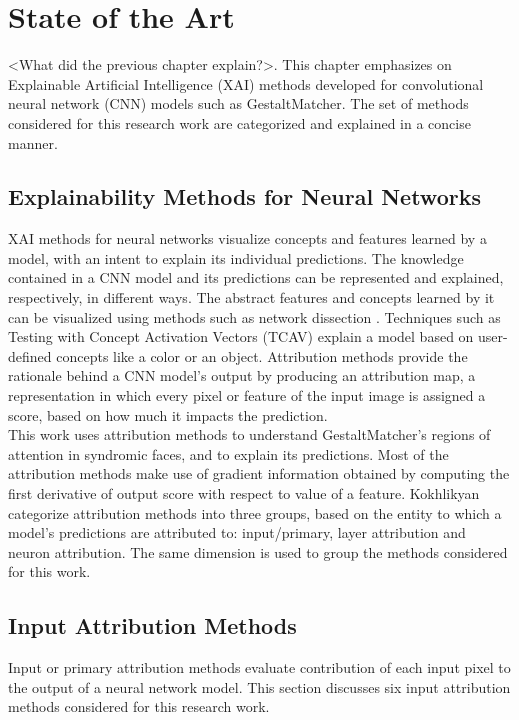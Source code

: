 \documentclass[../report.tex]{subfiles}
\begin{document}
    \chapter{State of the Art}
	<What did the previous chapter explain?>. This chapter emphasizes on Explainable Artificial Intelligence (XAI) methods developed for convolutional neural network (CNN) models such as GestaltMatcher. The set of methods considered for this research work are categorized and explained in a concise manner. 

    \section{Explainability Methods for Neural Networks}
    XAI methods for neural networks visualize concepts and features learned by a model, with an intent to explain its individual predictions. The knowledge contained in a CNN model and its predictions can be represented and explained, respectively, in different ways. The abstract features and concepts learned by it can be visualized using methods such as network dissection \cite{bau2017network}. Techniques such as Testing with Concept Activation Vectors (TCAV)\cite{tcav} explain a model based on user-defined concepts like a color or an object. Attribution methods provide the rationale behind a CNN model's output by producing an attribution map, a representation in which every pixel or feature of the input image is assigned a score, based on how much it impacts the prediction.\\
    This work uses attribution methods to understand GestaltMatcher's regions of attention in syndromic faces, and to explain its predictions. Most of the attribution methods make use of gradient information obtained by computing the first derivative of output score with respect to value of a feature. Kokhlikyan \etal \cite{kokhlikyan2020captum} categorize attribution methods into three groups, based on the entity to which a model's predictions are attributed to: input/primary, layer attribution and neuron attribution. The same dimension is used to group the methods considered for this work.
    
    \section{Input Attribution Methods}
    Input or primary attribution methods evaluate contribution of each input pixel to the output of a neural network model. This section discusses six input attribution methods considered for this research work.
\end{document}
